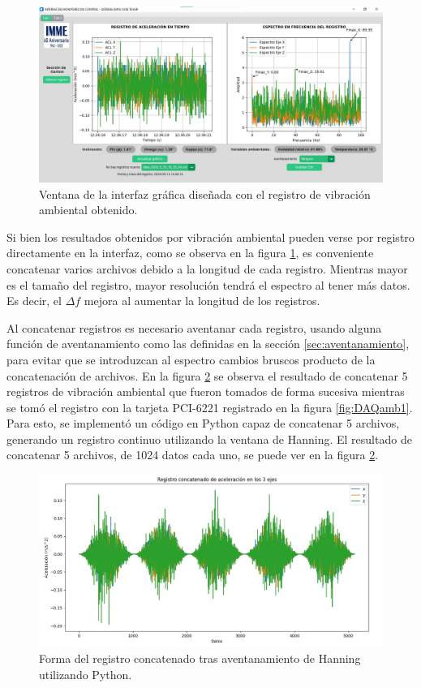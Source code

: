 \begin{figure}[H]
    \centering
    \includegraphics[width = \textwidth]{imagenes/cap3_resultados/Ensayos/VibAmb2SmartSensorGUI.jpg}
    \caption{Ventana de la interfaz gráfica diseñada con el registro de vibración ambiental obtenido.}
    \label{fig:ambientalGUI}
\end{figure}

Si bien los resultados obtenidos por vibración ambiental pueden verse por registro directamente en la interfaz, como se observa en la figura \ref{fig:ambientalGUI}, es conveniente concatenar varios archivos debido a la longitud de cada registro. Mientras mayor es el tamaño del registro, mayor resolución tendrá el espectro al tener más datos. Es decir, el $\Delta f$ mejora al aumentar la longitud de los registros.

Al concatenar registros es necesario aventanar cada registro, usando alguna función de aventanamiento como las definidas en la sección \ref{sec:aventanamiento}, para evitar que se introduzcan al espectro cambios bruscos producto de la concatenación de archivos. En la figura \ref{fig:concatenados5} se observa el resultado de concatenar 5 registros de vibración ambiental que fueron tomados de forma sucesiva mientras se tomó el registro con la tarjeta PCI-6221 registrado en la figura \ref{fig:DAQamb1}. Para esto, se implementó un código en Python capaz de concatenar 5 archivos, generando un registro continuo utilizando la ventana de Hanning. El resultado de concatenar 5 archivos, de 1024 datos cada uno, se puede ver en la figura \ref{fig:concatenados5}.

\begin{figure}[H]
    \centering
    \includegraphics[width = \textwidth]{imagenes/cap3_resultados/Ensayos/AmplitudVibAmb5CONCATENADASMARTSENSOR.jpg}
    \caption{Forma del registro concatenado tras aventanamiento de Hanning utilizando Python.}
    \label{fig:concatenados5}
\end{figure}

